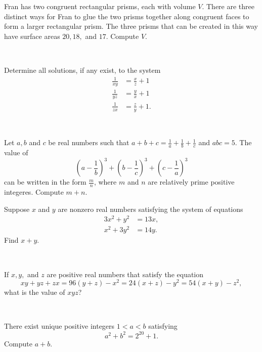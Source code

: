 \documentclass{article}
\begin{document}
\begin{prob}{5}
Fran has two congruent rectangular prisms, each with volume $V$. There are three distinct ways for Fran to glue the two prisms together along congruent faces to form a larger rectangular prism. The three prisms that can be created in this way have surface areas $20,18,$ and $17$. Compute $V$.
\end{prob}
\\

\begin{prob}[vvluo]{6}
Determine all solutions, if any exist, to the system
\begin{align*}
\frac{1}{xy}&=\frac{x}{z}+1 \\
\frac{1}{yz}&=\frac{y}{x}+1 \\
\frac{1}{zx}&=\frac{z}{y}+1.
\end{align*}
\end{prob}
\\

\begin{prob}[BMT 2020]{6}
Let $a,b$ and $c$ be real numbers such that $a+b+c=\frac{1}{a}+\frac{1}{b}+\frac{1}{c}$ and $abc=5$. The value of
$$(a-\frac{1}{b})^3+(b-\frac{1}{c})^3+(c-\frac{1}{a})^3$$
can be written in the form $\frac{m}{n}$, where $m$ and $n$ are relatively prime positive integeres. Compute $m+n$.
\end{prob}

\begin{prob}{6}
Suppose $x$ and $y$ are nonzero real numbers satisfying the system of equations
\begin{align*}
    3x^2 + y^2 &= 13x,\\
    x^2 + 3y^2 &= 14y.
\end{align*}
Find $x+y$.
\end{prob}
\\


\begin{req}[JMC 10 2021/18]{9}
If $x,y,$ and $z$ are positive real numbers that satisfy the equation
\[xy+yz+zx=96(y+z)-x^2 = 24(x+z) -y^2 = 54(x+y) -z^2,\]
what is the value of $xyz$?
\end{req}
\\

\begin{prob}[CARML 2019/8]{13}
There exist unique positive integers $1<a<b$ satisfying
\[a^2+b^2=2^{20}+1.\]
Compute $a+b$.
\end{prob}
\end{document}
